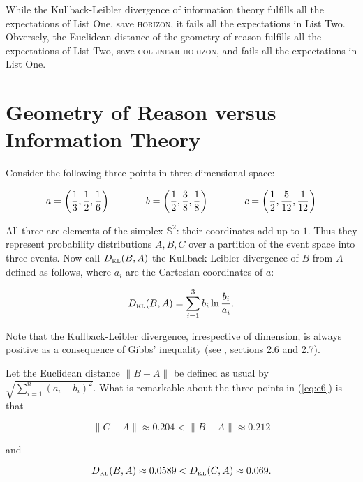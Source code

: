 \documentclass[11pt]{article}
\begin{document}
While the Kullback-Leibler divergence of information theory fulfills
all the expectations of List One, save \textsc{horizon}, it fails all
the expectations in List Two. Obversely, the Euclidean distance of the
geometry of reason fulfills all the expectations of List Two, save
\textsc{collinear horizon}, and fails all the expectations in List
One.

\section{Geometry of Reason versus Information Theory}
\label{grit}

Consider the following three points in three-dimensional space:

\begin{equation}
  \label{eq:e6}
  a=\left(\frac{1}{3},\frac{1}{2},\frac{1}{6}\right) \hspace{.5in}
  b=\left(\frac{1}{2},\frac{3}{8},\frac{1}{8}\right)  \hspace{.5in}
  c=\left(\frac{1}{2},\frac{5}{12},\frac{1}{12}\right)
\end{equation}

All three are elements of the simplex $\mathbb{S}^{2}$: their
coordinates add up to $1$. Thus they represent probability
distributions $A,B,C$ over a partition of the event space into three
events. Now call $D_{\mbox{\tiny KL}}(B,A)$ the Kullback-Leibler
divergence of $B$ from $A$ defined as follows, where $a_{i}$ are the
Cartesian coordinates of $a$:

\begin{equation}
  \label{eq:e7}
  D_{\mbox{\tiny KL}}(B,A)=\sum_{i=1}^{3}b_{i}\ln\frac{b_{i}}{a_{i}}.
\end{equation}

Note that the Kullback-Leibler divergence, irrespective of dimension,
is always positive as a consequence of Gibbs' inequality (see
, sections 2.6 and 2.7).

Let the Euclidean distance $\|B-A\|$ be defined as usual by
$\sqrt{\sum_{i=1}^{n}\left(a_{i}-b_{i}\right)^{2}}$. What is
remarkable about the three points in (\ref{eq:e6}) is that

\begin{equation}
  \label{eq:e8}
  \|C-A\|\approx{}0.204<\|B-A\|\approx{}0.212
\end{equation}

and

\begin{equation}
  \label{eq:e9}
  D_{\mbox{\tiny KL}}(B,A)\approx{}0.0589<D_{\mbox{\tiny KL}}(C,A)\approx{}0.069.
\end{equation}
\end{document}
